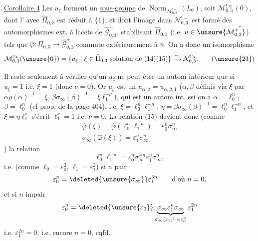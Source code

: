 \uline{Corollaire 4} Les $u_\xi$  forment un \uline{sous-groupe} de $\operatorname{Norm}_{\mathcal M_{0,3}^{!\sim}}(L_0)$, soit $\mathcal M_{0,3}^{!\approx}(0)$, dont l' avec $\widehat\Pi_{0,3}$ est réduit à $\{1\}$, et dont l'image dans $\mathcal N_{0,3}^{!\sim}$ est  formé des automorphismes ext. à lacets de $\widehat{\mathcal G}_{0,3}^{+}$, stabilisant $\widehat\Pi_{0,3}$ (i.e. $u\in\unsure{\mathcal M_{0,3}^{+\widehat{\ }}}$) tels que $\widehat\varphi:\widehat\Pi_{0,3}\to\widehat{\mathcal G}_{0,3}^{+}$ commute extérieurement à $u$. On a donc un isomorphisme
\[
\mathcal M_{0,3}^{!\approx}(\unsure{0})
=\{u_\xi\mid \xi\in\widehat\Pi_{0,3}\text{ solution de }(14)(15)\}
\xrightarrow{\sim}\mathcal N_{0,3}^{!\approx}.
\tag{\unsure{23}}
\]


Il reste seulement à vérifier qu'un $u_\xi$ ne peut être un autom intérieur que si $u_\xi=1$ i.e. $\xi=1$ (donc $\nu=0$). Or $u_\xi$ est un $u_{\alpha,\beta}=u_{\alpha,\beta,1}$ ($\alpha,\beta$ définis  via $\xi$ par $\alpha\rho(\alpha)^{-1}=\xi$, $\beta\sigma_\infty(\beta)^{-1}=\xi \ell_1^{-\nu}$), qui est un autom int. ssi on a $\alpha=\ell_0^n$, $\beta=\ell_0^n$ (cf prop. de la page 404), i.e. $\xi=\ell_0^n \ell_1^{-n}$, $\eta=\beta\sigma_\infty(\beta)^{-1}=\ell_0^n \ell_1^{-n}$, et   $\xi=\eta \ell_1^\nu$ s'écrit $\ell_1^\nu=1$ i.e. $\nu=0$. La relation (15) devient donc (comme
\[
\begin{gathered}
\widehat\varphi(\xi)=\widehat\varphi(\ell_0^n \ell_1^{-n})=\varepsilon_0^n\sigma_\infty^n\\
\sigma_\infty(\widehat\varphi(\xi))=\varepsilon_1^n\sigma_\infty^n
\end{gathered}
\]
)  la relation
\[
\ell_0^n \ell_1^{-n}=\varepsilon_0^n\sigma_\infty^{-n}\varepsilon_1^n\sigma_\infty^n,
\]
i.e. (comme $\ell_0=\varepsilon_0^2$, $\ell_1=\varepsilon_1^2$) si $n$ pair
\[
\varepsilon_0^n=\deleted{\unsure{\sigma_\infty}}\varepsilon_1^{3n}
\qquad\text{d'où }n=0,
\]
et si $n$ impair
\[
\varepsilon_0^n=\deleted{\unsure{\varepsilon_0}}\underbrace{\sigma_\infty\varepsilon_1^n\sigma_\infty}_{\sigma_\infty(\varepsilon_1)^n=\varepsilon_0^n}\varepsilon_1^{2n}
\]
i.e. $\varepsilon_1^{2n}=0$, i.e. encore $n=0$, cqfd.



